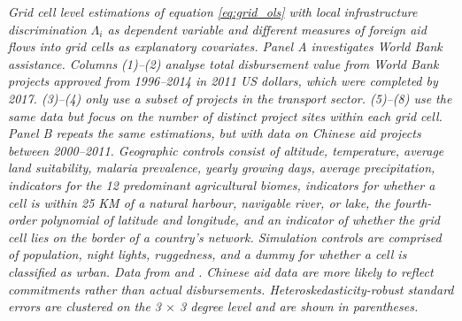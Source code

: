 \documentclass[11pt, oneside]{article}   	%
\renewcommand*\thetable{\Roman{table}}
\renewcommand*\thefigure{\Roman{figure}}
\newcommand{\mysubcaption}[1]{
\justify
\begin{spacing}{0.7}
\textit{\footnotesize #1}
\end{spacing}}
\begin{document}
\begin{table}[!ph]
\mysubcaption{Grid cell level estimations of equation \eqref{eq:grid_ols} with local infrastructure discrimination $\Lambda_{i}$ as dependent variable and different measures of foreign aid flows into grid cells as explanatory covariates. Panel A investigates World Bank assistance. Columns (1)--(2) analyse total disbursement value from World Bank projects approved from 1996--2014 in 2011 US dollars, which were completed by 2017. (3)--(4) only use a subset of projects in the transport sector. (5)--(8) use the same data but focus on the number of distinct project sites within each grid cell. Panel B repeats the same estimations, but with data on Chinese aid projects between 2000--2011. Geographic controls consist of altitude, temperature, average land suitability, malaria prevalence, yearly growing days, average precipitation, indicators for the 12 predominant agricultural biomes, indicators for whether a cell is within 25 KM of a natural harbour, navigable river, or lake, the fourth-order polynomial of latitude and longitude, and an indicator of whether the grid cell lies on the border of a country's network. Simulation controls are comprised of population, night lights, ruggedness, and a dummy for whether a cell is classified as urban. Data from \cite{AidData_WorldBankGeocoded_2017} and \cite{Strange_TrackingUnderreportedFinancial_2017}. Chinese aid data are more likely to reflect commitments rather than actual disbursements. Heteroskedasticity-robust standard errors are clustered on the 3 $\times$ 3 degree level and are shown in parentheses.}
\end{table}





  \newpage


  \renewcommand{\thesubsection}{\Alph{subsection}}
  \appendix
  \renewcommand{\thefigure}{A.\arabic{figure}}
  \setcounter{figure}{0}
  \renewcommand{\thetable}{A.\arabic{table}}
  \setcounter{table}{0}
  \renewcommand{\theequation}{A.\arabic{equation}}
  \setcounter{equation}{0}
  \renewcommand{\thefootnote}{A.\arabic{footnote}}
  \setcounter{footnote}{0}
\end{document}
